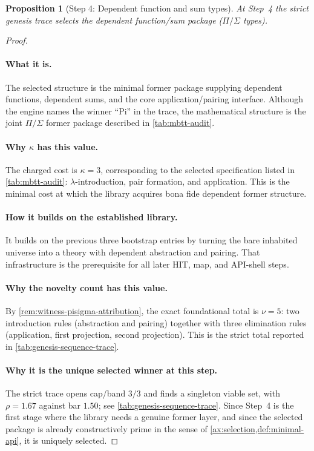 \documentclass[11pt,a4paper]{article}
\theoremstyle{plain}
\newtheorem{proposition}[theorem]{Proposition}
\theoremstyle{definition}
\theoremstyle{remark}
\begin{document}
\begin{proposition}[Step 4: Dependent function and sum types]
\label{prop:genesis-step4}
At Step~4 the strict genesis trace selects the dependent function/sum package
($\Pi/\Sigma$ types).
\end{proposition}

\begin{proof}
\paragraph{What it is.}
The selected structure is the minimal former package supplying dependent
functions, dependent sums, and the core application/pairing interface.
Although the engine names the winner ``Pi'' in the trace, the mathematical
structure is the joint $\Pi/\Sigma$ former package described in
\cref{tab:mbtt-audit}.

\paragraph{Why $\kappa$ has this value.}
The charged cost is $\kappa=3$, corresponding to the selected specification
listed in \cref{tab:mbtt-audit}: $\lambda$-introduction, pair formation, and
application.
This is the minimal cost at which the library acquires bona fide dependent
former structure.

\paragraph{How it builds on the established library.}
It builds on the previous three bootstrap entries by turning the bare inhabited
universe into a theory with dependent abstraction and pairing.
That infrastructure is the prerequisite for all later HIT, map, and API-shell
steps.

\paragraph{Why the novelty count has this value.}
By \cref{rem:witness-pisigma-attribution}, the exact foundational total is
$\nu=5$: two introduction rules (abstraction and pairing) together with three
elimination rules (application, first projection, second projection).
This is the strict total reported in \cref{tab:genesis-sequence-trace}.

\paragraph{Why it is the unique selected winner at this step.}
The strict trace opens cap/band $3/3$ and finds a singleton viable set, with
$\rho=1.67$ against bar $1.50$; see \cref{tab:genesis-sequence-trace}.
Since Step~4 is the first stage where the library needs a genuine former layer,
and since the selected package is already constructively prime in the sense of
\cref{ax:selection,def:minimal-api}, it is uniquely selected.
\end{proof}
\end{document}
